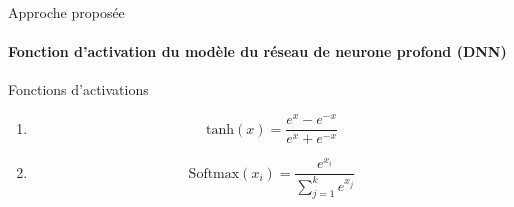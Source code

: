 \documentclass[aspectratio=169,professionalfonts, 12pt]{beamer}
\begin{document}
\begin{frame}{Approche proposée}
	\framesubtitle{Fonction d'activation du modèle du réseau de neurone profond (DNN)}
\begin{minipage}{0.5\textwidth}
\end{minipage}
\vspace{0.1cm}
\begin{minipage}{0.4\textwidth}
	\begin{block}{Fonctions d'activations}
	\begin{enumerate}
			 \item<1> {	
	$$\text{tanh}(x)= \frac{e^{x}-e^{-x}}{e^{x}+e^{-x}}$$
					 }
			 \item<2> {
	$$\text{Softmax}(x_i) = \frac{e^{x_i}}{\sum_{j=1}^k e^{x_j}}$$
 			}
		\end{enumerate}
	\end{block}
\end{minipage}
\end{frame} 
\end{document}

